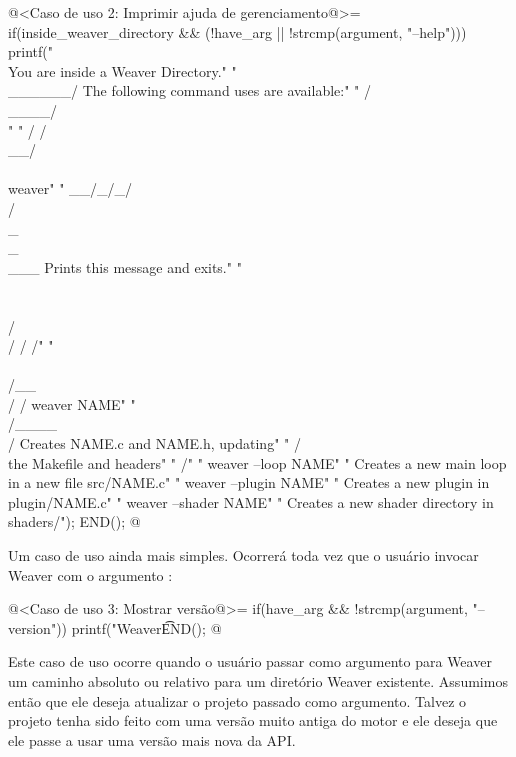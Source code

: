 {\iniciocodigo
@<Caso de uso 2: Imprimir ajuda de gerenciamento@>=
if(inside_weaver_directory && (!have_arg || !strcmp(argument, "--help"))){
  printf("       \\                You are inside a Weaver Directory.\n"
  "        \\______/        The following command uses are available:\n"
  "        /\\____/\\\n"
  "       / /\\__/\\ \\       weaver\n"
  "    __/_/_/\\/\\_\\_\\___     Prints this message and exits.\n"
  "      \\ \\ \\/\\/ / /\n"
  "       \\ \\/__\\/ /       weaver NAME\n"
  "        \\/____\\/          Creates NAME.c and NAME.h, updating\n"
  "        /      \\          the Makefile and headers\n"
  "       /\n"
  "                        weaver --loop NAME\n"
  "                         Creates a new main loop in a new file src/NAME.c\n\n"
  "                        weaver --plugin NAME\n"
  "                         Creates a new plugin in plugin/NAME.c\n\n"
  "                        weaver --shader NAME\n"
  "                         Creates a new shader directory in shaders/\n");
  END();
}
@
\fimcodigo


Um caso de uso ainda mais simples. Ocorrerá toda vez que o usuário
invocar Weaver com o argumento :

\iniciocodigo
@<Caso de uso 3: Mostrar versão@>=
if(have_arg && !strcmp(argument, "--version")){
  printf("Weaver\t%
  END();
}
@
\fimcodigo


Este caso de uso ocorre quando o usuário passar como argumento para
Weaver um caminho absoluto ou relativo para um diretório Weaver
existente. Assumimos então que ele deseja atualizar o projeto passado
como argumento. Talvez o projeto tenha sido feito com uma versão muito
antiga do motor e ele deseja que ele passe a usar uma versão mais
nova da API.

}
